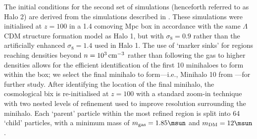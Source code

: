The initial conditions for the second set of simulations (henceforth referred to as Halo 2) are derived from the simulations described in \citet{StacyBromm2013}.  These simulations were initialised at $z=100$ in a 1.4 comoving Mpc box in accordance with the same $\Lambda$CDM structure formation model as Halo 1, but with $\sigma_8 = 0.9$ rather than the artificially enhanced $\sigma_8 = 1.4$ used in Halo 1. The use of `marker sinks'  for regions reaching densities beyond $n=10^3\,{\rm cm}^{-3}$ rather than following the gas to higher densities allows for the efficient identification of the first 10 minihaloes to form within the box; we select the final minihalo to form---i.e., Minihalo 10 from \citet{StacyBromm2013}---for further study.  After identifying the location of the final minihalo, the cosmological bix is re-initialised at $z=100$ with a standard zoom-in technique with two nested levels of refinement used to improve resolution surrounding the minihalo.  Each `parent' particle within the most refined region is split into 64 `child' particles, with a minimum mass of $m_{\rm gas}=1.85\msun$ and $m_{\rm \small DM}=12\msun$.